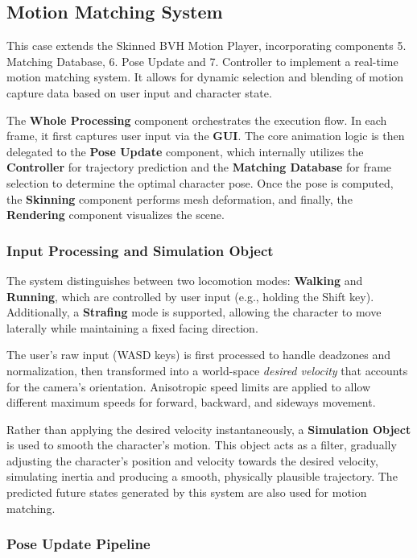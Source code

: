 \documentclass[8pt,a4paper]{extarticle}
\begin{document}
\subsection{Motion Matching System}
This case extends the Skinned BVH Motion Player, incorporating components 5. Matching Database, 6. Pose Update and 7. Controller to implement a real-time motion matching system. It allows for dynamic selection and blending of motion capture data based on user input and character state.

The \textbf{Whole Processing} component orchestrates the execution flow. In each frame, it first captures user input via the \textbf{GUI}. The core animation logic is then delegated to the \textbf{Pose Update} component, which internally utilizes the \textbf{Controller} for trajectory prediction and the \textbf{Matching Database} for frame selection to determine the optimal character pose. Once the pose is computed, the \textbf{Skinning} component performs mesh deformation, and finally, the \textbf{Rendering} component visualizes the scene.

\subsubsection{Input Processing and Simulation Object}
The system distinguishes between two locomotion modes: \textbf{Walking} and \textbf{Running}, which are controlled by user input (e.g., holding the Shift key). Additionally, a \textbf{Strafing} mode is supported, allowing the character to move laterally while maintaining a fixed facing direction.

The user's raw input (WASD keys) is first processed to handle deadzones and normalization, then transformed into a world-space \textit{desired velocity} that accounts for the camera's orientation. Anisotropic speed limits are applied to allow different maximum speeds for forward, backward, and sideways movement.

Rather than applying the desired velocity instantaneously, a \textbf{Simulation Object} is used to smooth the character's motion. This object acts as a filter, gradually adjusting the character's position and velocity towards the desired velocity, simulating inertia and producing a smooth, physically plausible trajectory. The predicted future states generated by this system are also used for motion matching.


\subsubsection{Pose Update Pipeline}
\end{document}
